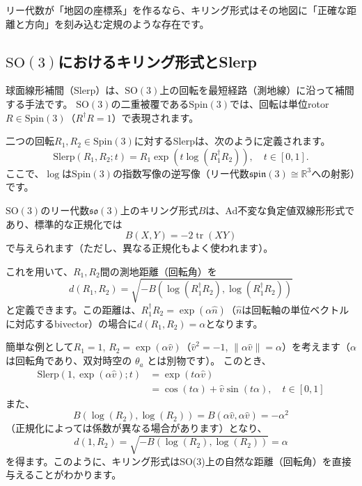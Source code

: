 \documentclass[a4paper,12pt,notitlepage]{jsreport}
\begin{document}
リー代数が「地図の座標系」を作るなら、キリング形式はその地図に「正確な距離と方向」を刻み込む定規のような存在です。

\subsection{$ \mathrm{SO}(3) $におけるキリング形式とSlerp}

球面線形補間（Slerp）は、$ \mathrm{SO}(3) $上の回転を最短経路（測地線）に沿って補間する手法です。
$ \mathrm{SO}(3) $の二重被覆である$ \mathrm{Spin}(3) $では、回転は単位rotor $R \in \mathrm{Spin}(3)$（$R^\dagger R = 1$）で表現されます。

二つの回転$R_1, R_2 \in \mathrm{Spin}(3)$に対するSlerpは、次のように定義されます。
\begin{equation}
  \mathrm{Slerp}(R_1, R_2; t) = R_1 \exp\left( t \log(R_1^\dagger R_2) \right), \quad t \in [0, 1].
\end{equation}
ここで、$\log$は$ \mathrm{Spin}(3) $の指数写像の逆写像（リー代数$\mathfrak{spin}(3) \cong \mathbb{R}^3$への射影）です。

$ \mathrm{SO}(3) $のリー代数$\mathfrak{so}(3)$上のキリング形式$B$は、Ad不変な負定値双線形形式であり、標準的な正規化では
\begin{equation}
  B(X, Y) = -2 \operatorname{tr}(X Y)
\end{equation}
で与えられます（ただし、異なる正規化もよく使われます）。

これを用いて、$R_1, R_2$間の測地距離（回転角）を
\begin{equation}
  d(R_1, R_2) = \sqrt{ -B(\log(R_1^\dagger R_2), \log(R_1^\dagger R_2)) }
\end{equation}
と定義できます。この距離は、$R_1^\dagger R_2 = \exp(\alpha \hat{n})$（$\hat{n}$は回転軸の単位ベクトルに対応するbivector）の場合に$d(R_1, R_2) = \alpha$となります。

簡単な例として$R_1 = 1$, $R_2 = \exp(\alpha \hat{v})$（$\hat{v}^2 = -1$, $\|\alpha \hat{v}\| = \alpha$）を考えます（$\alpha$ は回転角であり、双対時空の $\theta_a$ とは別物です）。
このとき、
\begin{equation}
  \begin{split}
    \mathrm{Slerp}(1, \exp(\alpha \hat{v}); t) 
    &= \exp(t \alpha \hat{v}) \\
    &= \cos(t\alpha) + \hat{v} \sin(t\alpha), \quad t \in [0,1]
  \end{split}
\end{equation}
また、
\begin{equation}
  B(\log(R_2), \log(R_2)) = B(\alpha \hat{v}, \alpha \hat{v}) = -\alpha^2
\end{equation}
（正規化によっては係数が異なる場合があります）となり、
\begin{equation}
  d(1, R_2) = \sqrt{-B(\log(R_2), \log(R_2))} = \alpha
\end{equation}
を得ます。このように、キリング形式はSO(3)上の自然な距離（回転角）を直接与えることがわかります。
\end{document}
